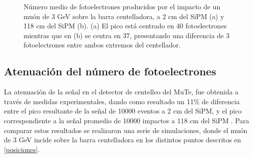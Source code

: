 \documentclass[12pt,oneside,openany,letter]{book}
\begin{document}
\begin{figure}[h!]
\begin{subfigure}{0.6\textwidth}
        \caption{}
        \label{fotoelec_118cm}
    \end{subfigure}
    \caption[Número medio de fotoelectrones producidos por el impacto de un muón sobre la barra centelladora]{Número medio de fotoelectrones producidos por el impacto de un muón de 3 GeV sobre la barra centelladora, a 2 cm del SiPM (a) y 118 cm del SiPM (b). (a) El pico está centrado en 40 fotoelectrones mientras que en (b) se centra en 37, presentando una diferencia de 3 fotoelectrones entre ambos extremos del centellador.}\label{fotoelect_barra_dif}
\end{figure}

\subsection{Atenuación del número de fotoelectrones}\label{atenuacion_seccion}
La atenuación de la señal en el detector de centelleo del MuTe, fue obtenida a través de medidas experimentales, dando como resultado un 11\% de diferencia entre el pico resultante de la señal de 10000 eventos a 2 cm del SiPM, y el pico correspondiente a la señal promedio de 10000 impactos a 118 cm del SiPM \cite{CalderonArdila2018}. Para comparar estos resultados se realizaron una serie de simulaciones, donde el muón de 3 GeV incide sobre la barra centelladora en los distintos puntos descritos en \ref{posiciones}. 
\end{document}
